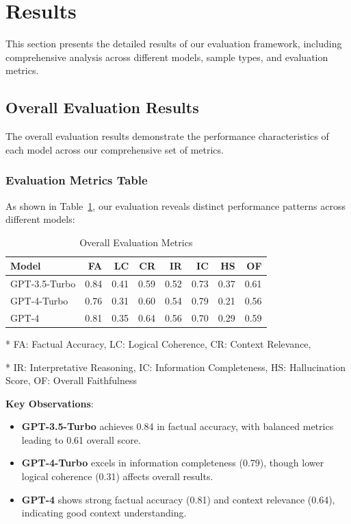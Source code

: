 \section{Results}
This section presents the detailed results of our evaluation framework, including comprehensive analysis across different models, sample types, and evaluation metrics.

\subsection{Overall Evaluation Results}
The overall evaluation results demonstrate the performance characteristics of each model across our comprehensive set of metrics.

\subsubsection{Evaluation Metrics Table}
As shown in Table~\ref{tab:results_overall_metrics}, our evaluation reveals distinct performance patterns across different models:

\begin{table}[!htbp]
\centering
\begin{tabular}{|l|r|r|r|r|r|r|r|}
\hline
\textbf{Model} & \textbf{FA} & \textbf{LC} & \textbf{CR} & \textbf{IR} 
& \textbf{IC} & \textbf{HS} & \textbf{OF} \\
\hline
GPT-3.5-Turbo & 0.84 & 0.41 & 0.59 & 0.52 & 0.73 & 0.37 & 0.61 \\
GPT-4-Turbo & 0.76 & 0.31 & 0.60 & 0.54 & 0.79 & 0.21 & 0.56 \\
GPT-4 & 0.81 & 0.35 & 0.64 & 0.56 & 0.70 & 0.29 & 0.59 \\
\hline
\end{tabular}
\caption{Overall Evaluation Metrics}
\label{tab:results_overall_metrics}
\begin{threeparttable}
\begin{tablenotes}
\small
\item[*] FA: Factual Accuracy, LC: Logical Coherence, CR: Context Relevance,
\item[*] IR: Interpretative Reasoning, IC: Information Completeness, HS: Hallucination Score, OF: Overall Faithfulness
\end{tablenotes}
\end{threeparttable}
\end{table}

\vspace{0.5em}
\textbf{Key Observations}:
\begin{itemize}
    \item \textbf{GPT-3.5-Turbo} achieves 0.84 in factual accuracy, with 
    balanced metrics leading to 0.61 overall score.
    
    \item \textbf{GPT-4-Turbo} excels in information completeness (0.79), 
    though lower logical coherence (0.31) affects overall results.
    
    \item \textbf{GPT-4} shows strong factual accuracy (0.81) and context 
    relevance (0.64), indicating good context understanding.
\end{itemize}

